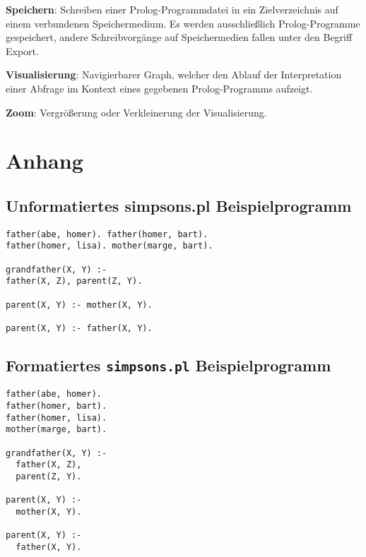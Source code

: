\documentclass[parskip=full,11pt,twoside]{scrartcl}
\begin{document}
\textbf{Speichern}:
Schreiben einer Prolog-Programmdatei in ein Zielverzeichnis auf einem verbundenen Speichermedium. Es werden ausschließlich Prolog-Programme gespeichert, andere Schreibvorgänge auf Speichermedien fallen unter den Begriff Export.

\textbf{Visualisierung}:
Navigierbarer Graph, welcher den Ablauf der Interpretation einer Abfrage im Kontext eines gegebenen Prolog-Programms aufzeigt.

\textbf{Zoom}:
Vergrößerung oder Verkleinerung der Visualisierung.

\newpage
\section{Anhang}

\subsection{Unformatiertes simpsons.pl Beispielprogramm}

\begin{lstlisting}
father(abe, homer). father(homer, bart).
father(homer, lisa). mother(marge, bart).

grandfather(X, Y) :-
father(X, Z), parent(Z, Y).

parent(X, Y) :- mother(X, Y).

parent(X, Y) :- father(X, Y).
\end{lstlisting}

\subsection{Formatiertes \texttt{simpsons.pl} Beispielprogramm}

\begin{lstlisting}
father(abe, homer).
father(homer, bart).
father(homer, lisa).
mother(marge, bart).

grandfather(X, Y) :-
  father(X, Z),
  parent(Z, Y).

parent(X, Y) :-
  mother(X, Y).

parent(X, Y) :-
  father(X, Y).
\end{lstlisting}
\end{document}

